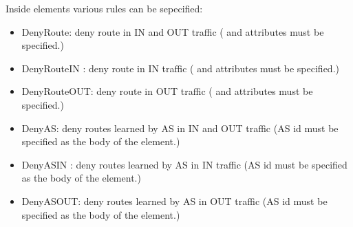 Inside  elements various rules can be sepecified:

\begin{itemize}
  \item DenyRoute: deny route in IN and OUT traffic ( and
         attributes must be specified.)
  \item DenyRouteIN : deny route in IN traffic ( and
         attributes must be specified.)
  \item DenyRouteOUT: deny route in OUT traffic ( and
         attributes must be specified.)
  \item DenyAS: deny routes learned by AS in IN  and OUT traffic (AS id must be
        specified as the body of the element.)
  \item DenyASIN : deny routes learned by AS in IN traffic (AS id must be
        specified as the body of the element.)
  \item DenyASOUT: deny routes learned by AS in OUT traffic (AS id must be
        specified as the body of the element.)
\end{itemize}


